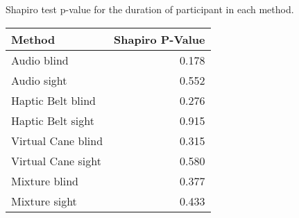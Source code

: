 
\centering
\caption{Shapiro test p-value for the duration of participant in each method.}
\label{tab:shapiro_duration}
\begin{tabular}{lr}
\toprule
            Method &  Shapiro P-Value \\
\midrule
       Audio blind &            0.178 \\
       Audio sight &            0.552 \\
 Haptic Belt blind &            0.276 \\
 Haptic Belt sight &            0.915 \\
Virtual Cane blind &            0.315 \\
Virtual Cane sight &            0.580 \\
     Mixture blind &            0.377 \\
     Mixture sight &            0.433 \\
\bottomrule
\end{tabular}
